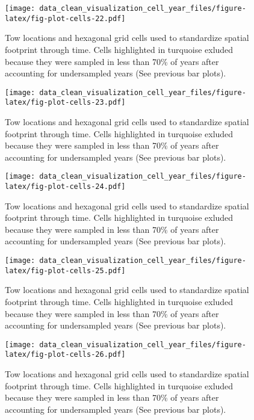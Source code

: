 \documentclass[
]{article}
\begin{document}
\begin{figure}
\centering
\texttt{[image: data\_clean\_visualization\_cell\_year\_files/figure-latex/fig-plot-cells-22.pdf]}
\caption{\label{fig:fig-plot-cells-22}Tow locations and hexagonal grid cells used to standardize spatial footprint through time. Cells highlighted in turquoise exluded because they were sampled in less than 70\% of years after accounting for undersampled years (See previous bar plots).}
\end{figure}

\begin{figure}
\centering
\texttt{[image: data\_clean\_visualization\_cell\_year\_files/figure-latex/fig-plot-cells-23.pdf]}
\caption{\label{fig:fig-plot-cells-23}Tow locations and hexagonal grid cells used to standardize spatial footprint through time. Cells highlighted in turquoise exluded because they were sampled in less than 70\% of years after accounting for undersampled years (See previous bar plots).}
\end{figure}

\begin{figure}
\centering
\texttt{[image: data\_clean\_visualization\_cell\_year\_files/figure-latex/fig-plot-cells-24.pdf]}
\caption{\label{fig:fig-plot-cells-24}Tow locations and hexagonal grid cells used to standardize spatial footprint through time. Cells highlighted in turquoise exluded because they were sampled in less than 70\% of years after accounting for undersampled years (See previous bar plots).}
\end{figure}

\begin{figure}
\centering
\texttt{[image: data\_clean\_visualization\_cell\_year\_files/figure-latex/fig-plot-cells-25.pdf]}
\caption{\label{fig:fig-plot-cells-25}Tow locations and hexagonal grid cells used to standardize spatial footprint through time. Cells highlighted in turquoise exluded because they were sampled in less than 70\% of years after accounting for undersampled years (See previous bar plots).}
\end{figure}

\begin{figure}
\centering
\texttt{[image: data\_clean\_visualization\_cell\_year\_files/figure-latex/fig-plot-cells-26.pdf]}
\caption{\label{fig:fig-plot-cells-26}Tow locations and hexagonal grid cells used to standardize spatial footprint through time. Cells highlighted in turquoise exluded because they were sampled in less than 70\% of years after accounting for undersampled years (See previous bar plots).}
\end{figure}
\end{document}
